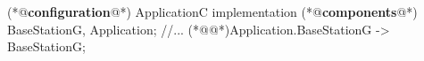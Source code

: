 \begin{Sbox}
\begin{minipage}{\columnwidth}
\begin{csource}
(*@\textbf{configuration}@*) ApplicationC {
}implementation {
  (*@\textbf{components}@*) BaseStationG, Application;
   //...
  (*@@*)Application.BaseStationG -> BaseStationG;}
\end{csource}
\end{minipage}
\end{Sbox}